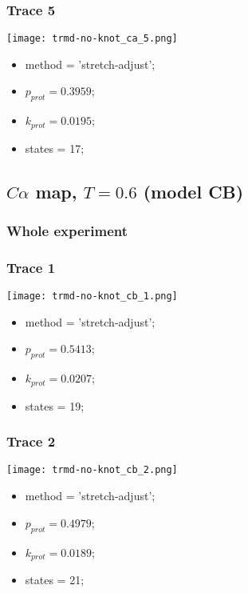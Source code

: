 \begin{minipage}[c]{0.45\textwidth}
\subsubsection{Trace 5}
\begin{minipage}[c]{0.7\textwidth}
    \texttt{[image: trmd-no-knot\_ca\_5.png]}
\end{minipage}
\hfill
\begin{minipage}[c]{0.45\textwidth}
    \begin{itemize}
        \item method = 'stretch-adjust';
        \item $p_{prot}=0.3959$;
        \item $k_{prot}=0.0195$;
        \item states = 17;
    \end{itemize}
\end{minipage}

\subsection{$C\alpha$ map, $T=0.6$ (model CB)}
\subsubsection{Whole experiment}

\subsubsection{Trace 1}
\begin{minipage}[c]{0.7\textwidth}
    \texttt{[image: trmd-no-knot\_cb\_1.png]}
\end{minipage}
\hfill
\begin{minipage}[c]{0.45\textwidth}
    \begin{itemize}
        \item method = 'stretch-adjust';
        \item $p_{prot}=0.5413$;
        \item $k_{prot}=0.0207$;
        \item states = 19;
    \end{itemize}
\end{minipage}

\subsubsection{Trace 2}
\begin{minipage}[c]{0.7\textwidth}
    \texttt{[image: trmd-no-knot\_cb\_2.png]}
\end{minipage}
\hfill
\begin{minipage}[c]{0.45\textwidth}
    \begin{itemize}
        \item method = 'stretch-adjust';
        \item $p_{prot}=0.4979$;
        \item $k_{prot}=0.0189$;
        \item states = 21;
    \end{itemize}
\end{minipage}


\end{minipage}
